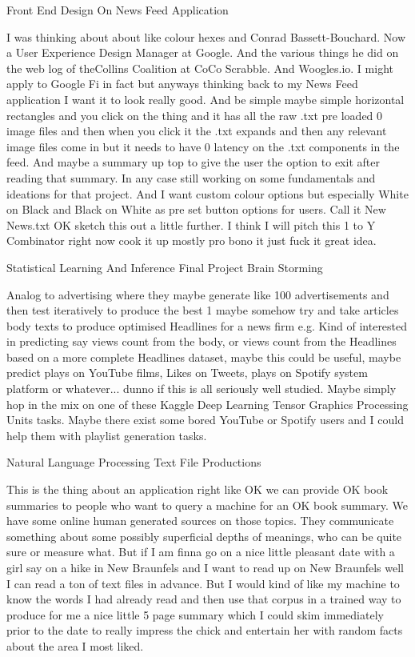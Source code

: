 	Front End Design On News Feed Application

I was thinking about about like colour hexes and Conrad Bassett-Bouchard. Now a User Experience Design Manager at Google. And the various things he did on the web log of theCollins Coalition at CoCo Scrabble. And Woogles.io. I might apply to Google Fi in fact but anyways thinking back to my News Feed application I want it to look really good. And be simple maybe simple horizontal rectangles and you click on the thing and it has all the raw .txt pre loaded 0 image files and then when you click it the .txt expands and then any relevant image files come in but it needs to have 0 latency on the .txt components in the feed. And maybe a summary up top to give the user the option to exit after reading that summary. In any case still working on some fundamentals and ideations for that project. And I want custom colour options but especially White on Black and Black on White as pre set button options for users. Call it New News.txt OK sketch this out a little further. I think I will pitch this 1 to Y Combinator right now cook it up mostly pro bono it just fuck it great idea.

	Statistical Learning And Inference Final Project Brain Storming

Analog to advertising where they maybe generate like 100 advertisements and then test iteratively to produce the best 1 maybe somehow try and take articles body texts to produce optimised Headlines for a news firm e.g. Kind of interested in predicting say views count from the body, or views count from the Headlines based on a more complete Headlines dataset, maybe this could be useful, maybe predict plays on YouTube films, Likes on Tweets, plays on Spotify system platform or whatever... dunno if this is all seriously well studied. Maybe simply hop in the mix on one of these Kaggle Deep Learning Tensor Graphics Processing Units tasks. Maybe there exist some bored YouTube or Spotify users and I could help them with playlist generation tasks.

	Natural Language Processing Text File Productions

This is the thing about an application right like OK we can provide OK book summaries to people who want to query a machine for an OK book summary. We have some online human generated sources on those topics. They communicate something about some possibly superficial depths of meanings, who can be quite sure or measure what. But if I am finna go on a nice little pleasant date with a girl say on a hike in New Braunfels and I want to read up on New Braunfels well I can read a ton of text files in advance. But I would kind of like my machine to know the words I had already read and then use that corpus in a trained way to produce for me a nice little 5 page summary which I could skim immediately prior to the date to really impress the chick and entertain her with random facts about the area I most liked.

